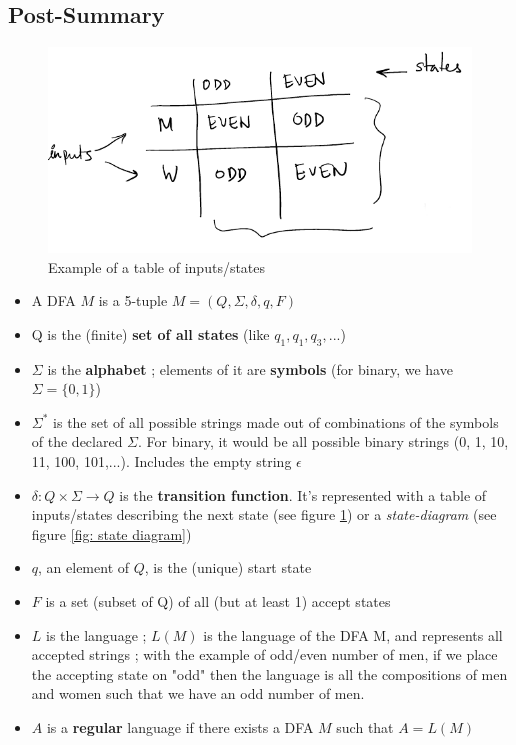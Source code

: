 \documentclass[12pt,a4paper]{article}
\newcommand{\<}{\langle}
\renewcommand{\>}{\rangle}
\begin{document}
\subsection{Post-Summary}
\begin{figure}
	\centering
	\includegraphics[scale=0.5]{images/table_state}
	\caption{Example of a table of inputs/states}
	\label{fig: table input/state}
\end{figure}
\begin{itemize}
	\item 	A DFA $M$ is a 5-tuple $M = (Q, \Sigma, \delta, q, F)$
	\item 	Q is the (finite) \textbf{set of all states }(like $q_1,q_1,q_3,...$)
	\item 	$\Sigma$ is the \textbf{alphabet} ; elements of it are \textbf{symbols} (for binary, we have $\Sigma = \{0,1\}$)
	\item 	$\Sigma^*$ is the set of all possible strings made out of combinations of the symbols of the declared $\Sigma$. For binary, it would be all possible binary strings (0, 1, 10, 11, 100, 101,...). Includes the empty string $\epsilon$
	\item 	$\delta : Q \times \Sigma \to Q$ is the \textbf{transition function}. It's represented with a table of inputs/states describing the next state (see figure \ref{fig: table input/state}) or a \textit{state-diagram} (see figure \ref{fig: state diagram})
	\item 	$q$, an element of $Q$, is the (unique) start state
	\item 	$F$ is a set (subset of Q) of all (but at least 1) accept states
	\item 	$L$ is the language ; $L(M)$ is the language of the DFA M, and represents all accepted strings ; with the example of odd/even number of men, if we place the accepting state on "odd" then the language is all the compositions of men and women such that we have an odd number of men.
	\item 	$A$ is a \textbf{regular} language if there exists a DFA $M$ such that $A = L(M)$
\end{itemize}
\end{document}
